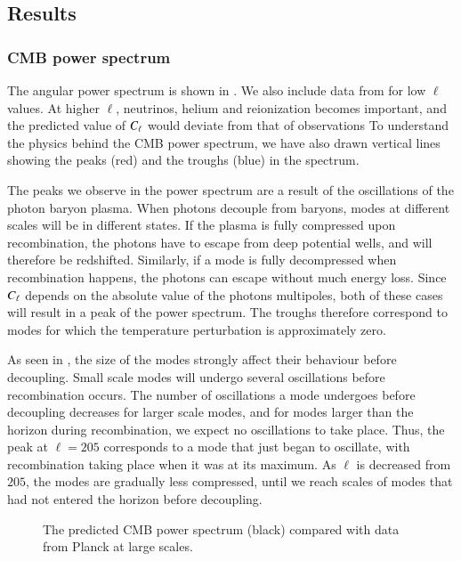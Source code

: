 \subsection{Results}\label{ssec:M4:results}


\subsubsection{CMB power spectrum} \label{sssec:M4:results:angular_power_spectrum}
The angular power spectrum is shown in . We also include data from \cite{Planck2020} for low $\ell$ values. At higher $\ell$, neutrinos, helium and reionization becomes important, and the predicted value of $C_\ell$ would deviate from that of observations  To understand the physics behind the CMB power spectrum, we have also drawn vertical lines showing the peaks (red) and the troughs (blue) in the spectrum. 

The peaks we observe in the power spectrum are a result of the oscillations of the photon baryon plasma. When photons decouple from baryons, modes at different scales will be in different states. If the plasma is fully compressed upon recombination, the photons have to escape from deep potential wells, and will therefore be redshifted. Similarly, if a mode is fully decompressed when recombination happens, the photons can escape without much energy loss. Since $C_\ell$ depends on the absolute value of the photons multipoles, both of these cases will result in a peak of the power spectrum. The troughs therefore correspond to modes for which the temperature perturbation is approximately zero.  

As seen in , the size of the modes strongly affect their behaviour before decoupling. Small scale modes will undergo several oscillations before recombination occurs. The number of oscillations a mode undergoes before decoupling decreases for larger scale modes, and for modes larger than the horizon during recombination, we expect no oscillations to take place. Thus, the peak at $\ell=205$ corresponds to a mode that just began to oscillate, with recombination taking place when it was at its maximum. As $\ell$ is decreased from $205$, the modes are gradually less compressed, until we reach scales of modes that had not entered the horizon before decoupling. 


\begin{figure}[ht!]
    \caption{The predicted CMB power spectrum (black) compared with data from Planck at large scales. }
    \label{fig:M4:results:peaks_and_troughs_cells}
\end{figure}

